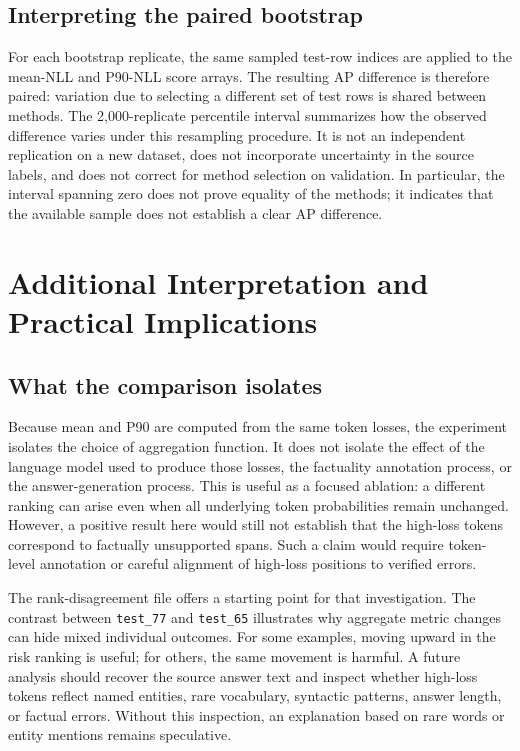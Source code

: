 \documentclass[manuscript,screen]{acmart}
\begin{document}
\subsection{Interpreting the paired bootstrap}
For each bootstrap replicate, the same sampled test-row indices are applied to the mean-NLL and P90-NLL score arrays. The resulting AP difference is therefore paired: variation due to selecting a different set of test rows is shared between methods. The 2,000-replicate percentile interval summarizes how the observed difference varies under this resampling procedure. It is not an independent replication on a new dataset, does not incorporate uncertainty in the source labels, and does not correct for method selection on validation. In particular, the interval spanning zero does not prove equality of the methods; it indicates that the available sample does not establish a clear AP difference.

\section{Additional Interpretation and Practical Implications}
\subsection{What the comparison isolates}
Because mean and P90 are computed from the same token losses, the experiment isolates the choice of aggregation function. It does not isolate the effect of the language model used to produce those losses, the factuality annotation process, or the answer-generation process. This is useful as a focused ablation: a different ranking can arise even when all underlying token probabilities remain unchanged. However, a positive result here would still not establish that the high-loss tokens correspond to factually unsupported spans. Such a claim would require token-level annotation or careful alignment of high-loss positions to verified errors.

The rank-disagreement file offers a starting point for that investigation. The contrast between \texttt{test\_77} and \texttt{test\_65} illustrates why aggregate metric changes can hide mixed individual outcomes. For some examples, moving upward in the risk ranking is useful; for others, the same movement is harmful. A future analysis should recover the source answer text and inspect whether high-loss tokens reflect named entities, rare vocabulary, syntactic patterns, answer length, or factual errors. Without this inspection, an explanation based on rare words or entity mentions remains speculative.
\end{document}
